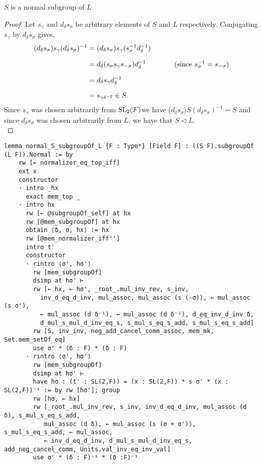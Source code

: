 \begin{lemma}
\label{SpecialSubgroups.normal_S_subgroupOf_L}
\leanok
$S$ is a normal subgroup of $L$
\end{lemma}
\begin{proof}
    \leanok
    Let $s_\gamma$ and $d_\delta s_\sigma$ be arbitrary elements of $S$ and $L$ respectively. Conjugating $s_\gamma$ by $d_\delta s_\sigma$ gives,
\begin{align*} (d_\delta s_\sigma) s_\gamma (d_\delta s_\sigma)^{-1} &= (d_\delta s_\sigma) s_\gamma (s^{-1}_\sigma d^{-1}_\delta) \\[1.5ex]
&=
d_\delta (s_\sigma s_\gamma s_{-\sigma}) d^{-1}_\delta \qquad \tag{since $s^{-1}_\sigma=s_{-\sigma}$} \\[1.5ex] 
&=
d_\delta s_\gamma d^{-1}_\delta \\[1.5ex] 
&= s_{\gamma \delta^{-2}} \in S. 
\end{align*}
Since $s_\gamma$ was chosen arbitrarily from $\operatorname{SL}_2(F)$we have ($d_\delta s_\sigma) S (d_\delta s_\sigma)^{-1} = S$ and since $d_\delta s_\sigma$ was chosen arbitrarily from $L$, we have that $S \vartriangleleft L$. \\
\end{proof}
\begin{footnotesize}
\begin{verbatim}
lemma normal_S_subgroupOf_L {F : Type*} [Field F] : ((S F).subgroupOf (L F)).Normal := by
    rw [← normalizer_eq_top_iff]
    ext x
    constructor
    · intro _hx
      exact mem_top _
    · intro hx
      rw [← @subgroupOf_self] at hx
      rw [@mem_subgroupOf] at hx
      obtain ⟨δ, σ, hx⟩ := hx
      rw [@mem_normalizer_iff'']
      intro t'
      constructor
      · rintro ⟨σ', hσ'⟩
        rw [mem_subgroupOf]
        dsimp at hσ' ⊢
        rw [← hx, ← hσ', _root_.mul_inv_rev, s_inv,
          inv_d_eq_d_inv, mul_assoc, mul_assoc (s (-σ)), ← mul_assoc (s σ'),
          ← mul_assoc (d δ⁻¹), ← mul_assoc (d δ⁻¹), d_eq_inv_d_inv δ,
          d_mul_s_mul_d_inv_eq_s, s_mul_s_eq_s_add, s_mul_s_eq_s_add]
        rw [S, inv_inv, neg_add_cancel_comm_assoc, mem_mk, Set.mem_setOf_eq]
        use σ' * (δ : F) * (δ : F)
      · rintro ⟨σ', hσ'⟩
        rw [mem_subgroupOf]
        dsimp at hσ' ⊢
        have hσ : (t' : SL(2,F)) = (x : SL(2,F)) * s σ' * (x : SL(2,F))⁻¹ := by rw [hσ']; group
        rw [hσ, ← hx]
        rw [_root_.mul_inv_rev, s_inv, inv_d_eq_d_inv, mul_assoc (d δ), s_mul_s_eq_s_add,
           mul_assoc (d δ), ← mul_assoc (s (σ + σ')), s_mul_s_eq_s_add, ← mul_assoc,
           ← inv_d_eq_d_inv, d_mul_s_mul_d_inv_eq_s, add_neg_cancel_comm, Units.val_inv_eq_inv_val]
        use σ' * (δ : F)⁻¹ * (δ :F)⁻¹
\end{verbatim}
\end{footnotesize}

